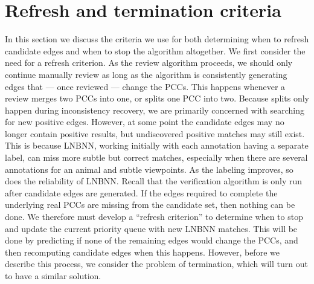 

\section{Refresh and termination criteria}\label{sec:converge}


In this section we discuss the criteria we use for both determining when to refresh candidate edges and when to
  stop the algorithm altogether.
We first consider the need for a refresh criterion.
As the review algorithm proceeds, we should only continue manually review as long as the algorithm is
  consistently generating edges that --- once reviewed --- change the PCCs.
This happens whenever a review merges two PCCs into one, or splits one PCC into two.
Because splits only happen during inconsistency recovery, we are primarily concerned with searching for new
  positive edges.
However, at some point the candidate edges may no longer contain positive results, but undiscovered positive
  matches may still exist.
This is because LNBNN, working initially with each annotation having a separate label, can miss more subtle but
  correct matches, especially when there are several annotations for an animal and subtle viewpoints.
As the labeling improves, so does the reliability of LNBNN.
Recall that the verification algorithm is only run after candidate edges are generated.
If the edges required to complete the underlying real PCCs are missing from the candidate set, then nothing can
  be done.
We therefore must develop a ``refresh criterion'' to determine when to stop and update the current priority queue
  with new LNBNN matches.
This will be done by predicting if none of the remaining edges would change the PCCs, and then recomputing
  candidate edges when this happens.
However, before we describe this process, we consider the problem of termination, which will turn out to have a
  similar solution.

